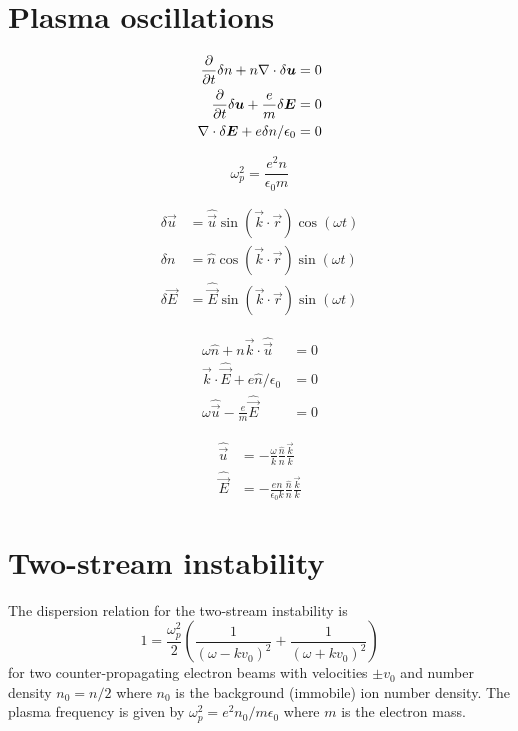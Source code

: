 \documentclass[aps,pre,notitlepage,amsmath,amssymb,amsfonts,nobibnotes,nofootinbib,superscriptaddress,onecolumn,a4paper,10pt]{revtex4-1}
\begin{document}
\section{Plasma oscillations}

\begin{align}
  \frac{\partial}{\partial t}\delta n + n\nabla\cdot\delta\bm{u} &= 0 \\
  \frac{\partial}{\partial t}\delta\bm{u} + \frac{e}{m}\delta\bm{E} &= 0 \\
  \nabla\cdot\delta\bm{E} + e\delta n/\epsilon_0 &= 0
\end{align}

\begin{equation}
  \omega_p^2 = \frac{e^2 n}{\epsilon_0 m}
\end{equation}

\begin{align}
  \delta\vec{u} &= \hat{\vec{u}}\sin(\vec{k}\cdot\vec{r})\cos(\omega t) \\
  \delta n &= \hat{n}\cos(\vec{k}\cdot\vec{r})\sin(\omega t) \\
  \delta\vec{E} &= \hat{\vec{E}}\sin(\vec{k}\cdot\vec{r})\sin(\omega t)
\end{align}

\begin{align}
  \omega\hat{n} + n\vec{k}\cdot\hat{\vec{u}} &= 0 \\
  \vec{k}\cdot\hat{\vec{E}} + e\hat{n}/\epsilon_0 &= 0 \\
  \omega\hat{\vec{u}} - \frac{e}{m}\hat{\vec{E}} &= 0
\end{align}

\begin{align}
  \hat{\vec{u}} &= -\frac{\omega}{k}\frac{\hat{n}}{n}\frac{\vec{k}}{k} \\
  \hat{\vec{E}} &= -\frac{en}{\epsilon_0 k}\frac{\hat{n}}{n}\frac{\vec{k}}{k}
\end{align}

\section{Two-stream instability}

The dispersion relation for the two-stream instability is
\begin{equation}
  1 = \frac{\omega_p^2}{2}
  \left(\frac{1}{(\omega - k v_0)^2} + \frac{1}{(\omega + k v_0)^2}\right)
\end{equation}
for two counter-propagating electron beams with velocities $\pm v_0$ and
number density $n_0 = n/2$ where $n_0$ is the background (immobile) ion number
density. The plasma frequency is given by $\omega_p^2 = e^2 n_0/m\epsilon_0$
where $m$ is the electron mass.
\end{document}
